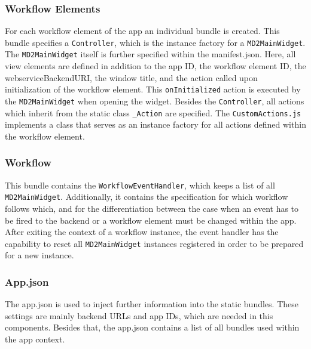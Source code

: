 \subsubsection{Workflow Elements}

For each workflow element of the app an individual bundle is created. This bundle specifies a \lstinline|Controller|, which is the instance factory for a \lstinline|MD2MainWidget|. The \lstinline|MD2MainWidget| itself is further specified within the manifest.json. Here, all view elements are defined in addition to the app ID, the workflow element ID, the webserviceBackendURI, the window title, and the action called upon initialization of the workflow element. This \lstinline|onInitialized| action is executed by the \lstinline|MD2MainWidget| when opening the widget. Besides the \lstinline|Controller|, all actions which inherit from the static class \lstinline|_Action| are specified. The \lstinline|CustomActions.js| implements a class that serves as an instance factory for all actions defined within the workflow element.

\subsubsection{Workflow}
This bundle contains the \lstinline|WorkflowEventHandler|, which keeps a list of all  \lstinline|MD2MainWidget|. Additionally, it contains the specification for which workflow follows which, and for the differentiation between the case when an event has to be fired to the backend or a workflow element must be changed within the app. After exiting the context of a workflow instance, the event handler has the capability to reset all \lstinline|MD2MainWidget| instances registered in order to be prepared for a new instance.

\subsubsection{App.json} \label{subsubsec:mapapps-generated-appjson}
The app.json is used to inject further information into the static bundles. These settings are mainly backend URLs and app IDs, which are needed in this components.
Besides that, the app.json  contains a list of all bundles used within the app context.
